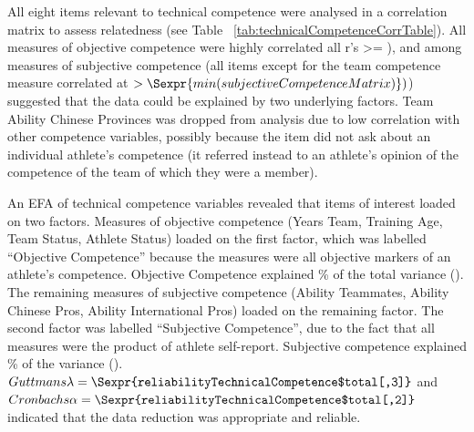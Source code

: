
All eight items relevant to technical competence were analysed in a correlation matrix to assess relatedness (see Table ~\ref{tab:technicalCompetenceCorrTable}). All measures of objective competence were highly correlated all r's >= ),  and among measures of subjective competence (all items except for the team competence measure correlated at $> \Sexpr{min(subjectiveCompetenceMatrix)})$) suggested that the data could be explained by two underlying factors. Team Ability Chinese Provinces was dropped from analysis due to low correlation with other competence variables, possibly because the item did not ask about an individual athlete’s competence (it referred instead to an athlete’s opinion of the competence of the team of which they were a member).

An EFA of technical competence variables revealed that items of interest loaded on two factors. Measures of objective competence (Years Team, Training Age, Team Status, Athlete Status) loaded on the first factor, which was labelled ``Objective Competence'' because the measures were all objective markers of an athlete's competence.
Objective Competence explained \% of the total variance (). The remaining measures of subjective competence (Ability Teammates, Ability Chinese Pros, Ability International Pros) loaded on the remaining factor.  The second factor was labelled ``Subjective Competence'', due to the fact that all measures were the product of athlete self-report.  Subjective competence explained \% of the variance ().
$Guttmans \lambda = \Sexpr{reliabilityTechnicalCompetence$total[,3]}$ and $Cronbachs \alpha = \Sexpr{reliabilityTechnicalCompetence$total[,2]}$ indicated that the data reduction was appropriate and reliable.



